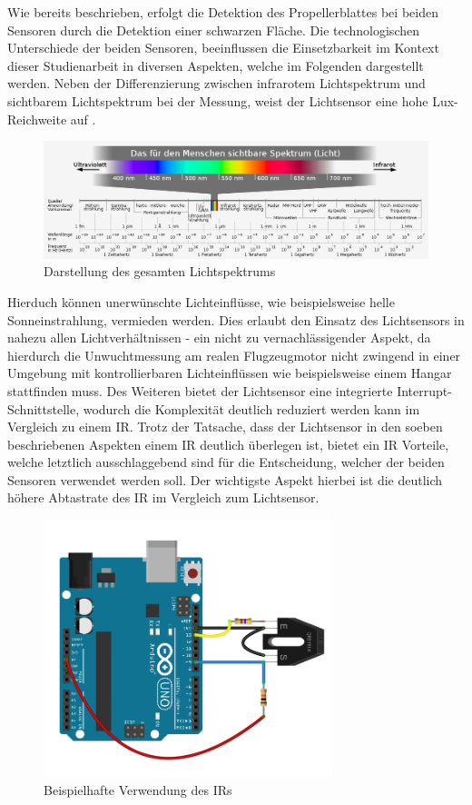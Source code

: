 Wie bereits beschrieben, erfolgt die Detektion des Propellerblattes bei beiden Sensoren durch die Detektion einer schwarzen Fläche.
Die technologischen Unterschiede der beiden Sensoren, beeinflussen die Einsetzbarkeit im Kontext dieser Studienarbeit in diversen Aspekten, welche im Folgenden dargestellt werden.
Neben der Differenzierung zwischen infrarotem Lichtspektrum und sichtbarem Lichtspektrum bei der Messung, weist der Lichtsensor eine hohe Lux-Reichweite auf \cite[S.1]{tsl2591_datasheet}.
\begin{figure}[H]
	\centering
	\includegraphics[width=\textwidth]{images/chapter/03/lichtspektrum.png}
	\caption{Darstellung des gesamten Lichtspektrums \cite[]{light_spectrum}}
\end{figure}
Hierduch können unerwünschte Lichteinflüsse, wie beispielsweise helle Sonneinstrahlung, vermieden werden.
Dies erlaubt den Einsatz des Lichtsensors in nahezu allen Lichtverhältnissen - ein nicht zu vernachlässigender Aspekt, da hierdurch die Unwuchtmessung am realen Flugzeugmotor nicht zwingend in einer Umgebung mit kontrollierbaren Lichteinflüssen wie beispielsweise einem Hangar stattfinden muss.
Des Weiteren bietet der Lichtsensor eine integrierte Interrupt-Schnittstelle, wodurch die Komplexität deutlich reduziert werden kann im Vergleich zu einem \ac{IR}.
Trotz der Tatsache, dass der Lichtsensor in den soeben beschriebenen Aspekten einem \ac{IR} deutlich überlegen ist, bietet ein \ac{IR} Vorteile, welche letztlich ausschlaggebend sind für die Entscheidung, welcher der beiden Sensoren verwendet werden soll.
Der wichtigste Aspekt hierbei ist die deutlich höhere Abtastrate des \ac{IR} im Vergleich zum Lichtsensor. 
\begin{figure}[H]
	\centering
	\includegraphics[width=0.75\textwidth]{images/chapter/03/sensor_ir_schaltung.png}
	\caption{Beispielhafte Verwendung des \ac{IR}s \cite{sensor_ir_schaltung}}
	\label{fig:ir_example}
\end{figure}
